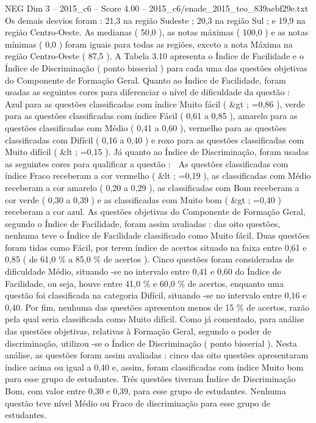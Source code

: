 \begin{textsample}{NEG Dim 3 – 2015\_c6 – Score 4.00 – 2015\_c6/enade\_2015\_teo\_839aebf29e.txt}
Os demais desvios foram : 21,3 na região Sudeste ; 20,3 na região Sul ; e 19,9 na região Centro-Oeste.
As medianas ( 50,0 ), as notas máximas ( 100,0 ) e as notas mínimas ( 0,0 ) foram iguais para todas as regiões, exceto a nota Máxima na região Centro-Oeste ( 87,5 ).
A Tabela 3.10 apresenta o Índice de Facilidade e o Índice de Discriminação ( ponto bisserial ) para cada uma das questões objetivas do Componente de Formação Geral.
Quanto ao Índice de Facilidade, foram usadas as seguintes cores para diferenciar o nível de dificuldade da questão :  Azul para as questões classificadas com índice Muito fácil ( \&gt ; =0,86 ), verde para as questões classificadas com índice Fácil ( 0,61 a 0,85 ), amarelo para as questões classificadas com Médio ( 0,41 a 0,60 ), vermelho para as questões classificadas com Difícil ( 0,16 a 0,40 ) e roxo para as questões classificadas com Muito difícil ( \&lt ; =0,15 ).
Já quanto ao Índice de Discriminação, foram usadas as seguintes cores para qualificar a questão :  As questões classificadas com índice Fraco receberam a cor vermelho ( \&lt ; =0,19 ), as classificadas com Médio receberam a cor amarelo ( 0,20 a 0,29 ), as classificadas com Bom receberam a cor verde ( 0,30 a 0,39 ) e as classificadas com Muito bom ( \&gt ; =0,40 ) receberam a cor azul.
As questões objetivas do Componente de Formação Geral, segundo o Índice de Facilidade, foram assim avaliadas : das oito questões, nenhuma teve o Índice de Facilidade classificado como Muito fácil.
Duas questões foram tidas como Fácil, por terem índice de acertos situado na faixa entre 0,61 e 0,85 ( de 61,0 \% a 85,0 \% de acertos ).
Cinco questões foram consideradas de dificuldade Médio, situando -se no intervalo entre 0,41 e 0,60 do Índice de Facilidade, ou seja, houve entre 41,0 \% e 60,0 \% de acertos, enquanto uma questão foi classificada na categoria Difícil, situando -se no intervalo entre 0,16 e 0,40.
Por fim, nenhuma das questões apresentou menos de 15 \% de acertos, razão pela qual seria classificada como Muito difícil.
Como já comentado, para análise das questões objetivas, relativas à Formação Geral, segundo o poder de discriminação, utilizou -se o Índice de Discriminação ( ponto bisserial ).
Nesta análise, as questões foram assim avaliadas : cinco das oito questões apresentaram índice acima ou igual a 0,40 e, assim, foram classificadas com índice Muito bom para esse grupo de estudantes.
Três questões tiveram Índice de Discriminação Bom, com valor entre 0,30 e 0,39, para esse grupo de estudantes.
Nenhuma questão teve nível Médio ou Fraco de discriminação para esse grupo de estudantes.

\end{textsample}
